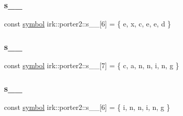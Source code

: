 \mbox{\label{namespaceirk_1_1porter2_a8bd82e00fa91a26ec105506548ae6f6a}} 
\subsubsection{\texorpdfstring{s\+\_\+\_}{s\_9\_2}}
{\footnotesize\ttfamily const \mbox{\hyperlink{namespaceirk_1_1porter2_afd04c4eb58a1dabcf8f3ab2d7e9f9ed5}{symbol}} irk\+::porter2\+::s\+\_\+\_\mbox{[}6\mbox{]} = \{ \textquotesingle{}e\textquotesingle{}, \textquotesingle{}x\textquotesingle{}, \textquotesingle{}c\textquotesingle{}, \textquotesingle{}e\textquotesingle{}, \textquotesingle{}e\textquotesingle{}, \textquotesingle{}d\textquotesingle{} \}\hspace{0.3cm}{\ttfamily [static]}}

\mbox{\label{namespaceirk_1_1porter2_a90edb93a0d0bcb648a498387b1ffcbf8}} 
\subsubsection{\texorpdfstring{s\+\_\+\_}{s\_9\_3}}
{\footnotesize\ttfamily const \mbox{\hyperlink{namespaceirk_1_1porter2_afd04c4eb58a1dabcf8f3ab2d7e9f9ed5}{symbol}} irk\+::porter2\+::s\+\_\+\_\mbox{[}7\mbox{]} = \{ \textquotesingle{}c\textquotesingle{}, \textquotesingle{}a\textquotesingle{}, \textquotesingle{}n\textquotesingle{}, \textquotesingle{}n\textquotesingle{}, \textquotesingle{}i\textquotesingle{}, \textquotesingle{}n\textquotesingle{}, \textquotesingle{}g\textquotesingle{} \}\hspace{0.3cm}{\ttfamily [static]}}

\mbox{\label{namespaceirk_1_1porter2_a9c1bde00e13c37049ad9b00e51f1274b}} 
\subsubsection{\texorpdfstring{s\+\_\+\_}{s\_9\_4}}
{\footnotesize\ttfamily const \mbox{\hyperlink{namespaceirk_1_1porter2_afd04c4eb58a1dabcf8f3ab2d7e9f9ed5}{symbol}} irk\+::porter2\+::s\+\_\+\_\mbox{[}6\mbox{]} = \{ \textquotesingle{}i\textquotesingle{}, \textquotesingle{}n\textquotesingle{}, \textquotesingle{}n\textquotesingle{}, \textquotesingle{}i\textquotesingle{}, \textquotesingle{}n\textquotesingle{}, \textquotesingle{}g\textquotesingle{} \}\hspace{0.3cm}{\ttfamily [static]}}

